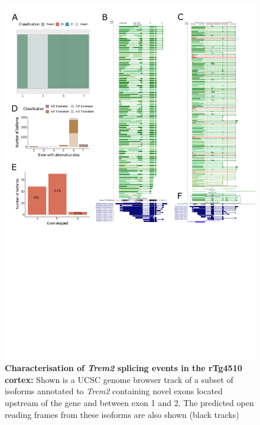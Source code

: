 \begin{figure}[htp]
	\centering
	\captionsetup{width=0.95\textwidth}
	\includegraphics[page=8,trim={0 23cm 0 0},scale = 0.85]{Figures/TargetGenes_Annotation_Portrait.pdf}
	\caption[Characterisation of \textit{Trem2} novel exons]%
	{\textbf{Characterisation of \textit{Trem2} splicing events in the rTg4510 cortex:} Shown is a UCSC genome browser track of a subset of isoforms annotated to \textit{Trem2} containing novel exons located upstream of the gene and between exon 1 and 2. The predicted open reading frames from these isoforms are also shown (black tracks)}    
	\label{fig:trem2_orf}
\end{figure}




